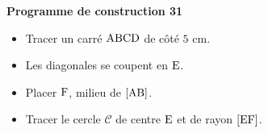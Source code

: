 \documentclass[exercice,a4]{thedocument}%
\begin{document}
%
\noindent\textbf{Programme de construction 31}\par\smallskip\noindent
\begin{itemize}
    \item Tracer un carré $\text{ABCD}$ de côté $5\text{ cm}$.
    \item Les diagonales se coupent en $\text{E}$.
    \item Placer $\text{F}$, milieu de $[\text{AB}]$.
    \item Tracer le cercle $\mathcal{C}$ de centre $\text{E}$ et de
    rayon $[\text{EF}]$.
\end{itemize}
\end{document}
